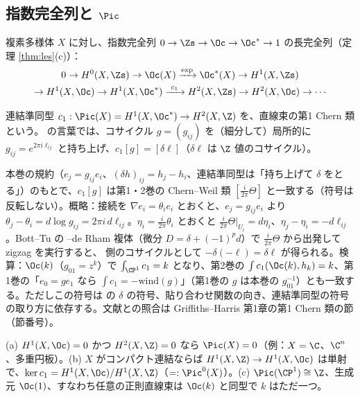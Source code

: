 \subsection{指数完全列と $\Pic$}
複素多様体 $X$ に対し、指数完全列 $0\to\Zs\to\Oc\to\Oc^*\to1$ の長完全列（定理 \ref{thm:les}(c)）：
\begin{multline*}
0\to H^0(X,\Zs)\to\Oc(X)\xrightarrow{\exp}\Oc^*(X)\to H^1(X,\Zs)\\
\to H^1(X,\Oc)\to H^1(X,\Oc^*)\xrightarrow{\ c_1\ }H^2(X,\Zs)\to H^2(X,\Oc)\to\cdots
\end{multline*}
\begin{defn}
連結準同型 $c_1:\Pic(X)=H^1(X,\Oc^*)\to H^2(X,\Z)$ を、直線束の第1 Chern 類という。\Cech{} の言葉では、コサイクル $g=(g_{ij})$ を（細分して）局所的に $g_{ij}=e^{2\pi i\ell_{ij}}$ と持ち上げ、$c_1[g]=[\delta\ell]$（$\delta\ell$ は $\Z$ 値のコサイクル）。
\end{defn}
\begin{rem}\label{rem:c1sign}
本巻の規約（$e_j=g_{ij}e_i$、$(\delta h)_{ij}=h_j-h_i$、連結準同型は「持ち上げて $\delta$ をとる」）のもとで、$c_1[g]$ は第1・2巻の Chern--Weil 類 $[\frac i{2\pi}\Theta]$ と一致する（符号は反転しない）。概略：接続を $\nabla e_i=\theta_ie_i$ とおくと、$e_j=g_{ij}e_i$ より $\theta_j-\theta_i=d\log g_{ij}=2\pi i\,d\ell_{ij}$。$\eta_i=\frac i{2\pi}\theta_i$ とおくと $\frac i{2\pi}\Theta|_{U_i}=d\eta_i$、$\eta_j-\eta_i=-d\ell_{ij}$。Bott--Tu の \Cech--de Rham 複体（微分 $D=\delta+(-1)^pd$）で $\frac i{2\pi}\Theta$ から出発して zigzag を実行すると、\Cech{} 側のコサイクルとして $-\delta(-\ell)=\delta\ell$ が得られる。検算：$\Oc(k)$（$g_{01}=z^k$）で $\int_{\CP^1}c_1=k$ となり、第2巻の $\int c_1(\Oc(k),h_k)=k$、第1巻の「$e_0=ge_1$ なら $\int c_1=-\mathrm{wind}(g)$」（第1巻の $g$ は本巻の $g_{01}^{-1}$）とも一致する。ただしこの符号は \Cech{} の $\delta$ の符号、貼り合わせ関数の向き、連結準同型の符号の取り方に依存する。文献との照合は Griffiths--Harris 第1章の第1 Chern 類の節\tQ{}（節番号）。
\end{rem}
\begin{prop}\label{prop:Pic}\tP
(a) $H^1(X,\Oc)=0$ かつ $H^2(X,\Z)=0$ なら $\Pic(X)=0$（例：$X=\C$、$\C^n$、多重円板）。(b) $X$ がコンパクト連結ならば $H^1(X,\Z)\to H^1(X,\Oc)$ は単射で、$\ker c_1=H^1(X,\Oc)/H^1(X,\Z)$（$=:\Pic^0(X)$）。(c) $\Pic(\CP^1)\cong\Z$、生成元 $\Oc(1)$、すなわち任意の正則直線束は $\Oc(k)$ と同型で $k$ はただ一つ。
\end{prop}
